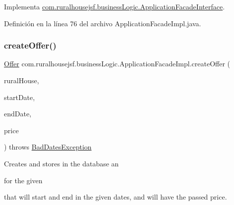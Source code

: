 Implementa \mbox{\hyperlink{interfacecom_1_1ruralhousejsf_1_1business_logic_1_1_application_facade_interface_acb939a4c57b1136e2e8d1c7b661c10af}{com.\+ruralhousejsf.\+business\+Logic.\+Application\+Facade\+Interface}}.



Definición en la línea 76 del archivo Application\+Facade\+Impl.\+java.

\mbox{\label{classcom_1_1ruralhousejsf_1_1business_logic_1_1_application_facade_impl_acbf81cc6dc4bf9adf9ea7a85751edfc0}} 
\subsubsection{\texorpdfstring{createOffer()}{createOffer()}\hspace{0.1cm}{\footnotesize\ttfamily [1/2]}}
{\footnotesize\ttfamily \mbox{\hyperlink{classcom_1_1ruralhousejsf_1_1domain_1_1_offer}{Offer}} com.\+ruralhousejsf.\+business\+Logic.\+Application\+Facade\+Impl.\+create\+Offer (\begin{DoxyParamCaption}\item[{\mbox{\hyperlink{classcom_1_1ruralhousejsf_1_1domain_1_1_rural_house}{Rural\+House}}}]{rural\+House,  }\item[{Local\+Date}]{start\+Date,  }\item[{Local\+Date}]{end\+Date,  }\item[{double}]{price }\end{DoxyParamCaption}) throws \mbox{\hyperlink{classcom_1_1ruralhousejsf_1_1exceptions_1_1_bad_dates_exception}{Bad\+Dates\+Exception}}}

Creates and stores in the database an
\begin{DoxyCode}{0}
\end{DoxyCode}
 for the given
\begin{DoxyCode}{0}
\end{DoxyCode}
 that will start and end in the given dates, and will have the passed price.


